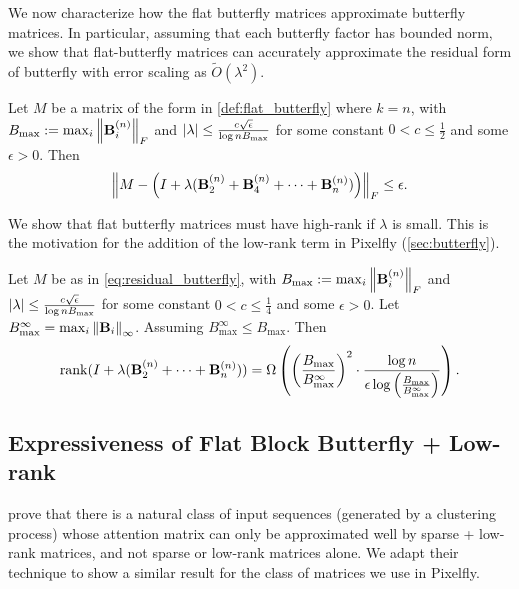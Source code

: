 We now characterize how the flat butterfly matrices approximate butterfly
matrices.
In particular, assuming that each butterfly factor has bounded norm,
we show that flat-butterfly matrices can accurately approximate the residual
form of butterfly with error scaling as $\tilde{O}(\lambda^2)$.
\begin{theorem}
  \label{thm:flat_butterfly_approx}
  Let $M$ be a matrix of the form in \cref{def:flat_butterfly} where $k = n$, with
  $B_\mathrm{max} := \max_{i} \left\|{\mathbf{B}_i^{(n)}}\right\|_F$ and
  $\left\lvert\lambda\right\rvert \leq \frac{c \sqrt{\epsilon}}{\log n B_\mathrm{max}}$ for some
  constant $0 < c \leq \frac{1}{2}$ and some $\epsilon > 0$.
  Then
  \begin{equation*}
    \left\|{M - \left( I + \lambda (\mathbf{B}_2^{(n)} + \mathbf{B}_{4}^{(n)} + \dots + \mathbf{B}_n^{(n)}) \right)}\right\|_F \leq \epsilon.
  \end{equation*}
\end{theorem}

We show that flat butterfly matrices must have high-rank if $\lambda$ is small.
This is the motivation for the addition of the low-rank term in Pixelfly (\cref{sec:butterfly}).
\begin{theorem}
  \label{thm:flat_butterfly_rank}
  Let $M$ be as in \cref{eq:residual_butterfly}, with
  $B_\mathrm{max} := \max_{i} \left\|{\mathbf{B}_i^{(n)}}\right\|_F$ and
  $\left\lvert\lambda\right\rvert \leq \frac{c \sqrt{\epsilon}}{\log n B_\mathrm{max}}$ for some
  constant $0 < c \leq \frac{1}{4}$ and some $\epsilon > 0$.
  Let $B^\infty_\mathrm{max} = \max_i \left\|{\mathbf{B}_i}\right\|_\infty$.
  Assuming $B^\infty_\mathrm{max} \leq B_\mathrm{max}$.
  Then
  \begin{equation*}
    \mathrm{rank}(I + \lambda (\mathbf{B}_2^{(n)} + \dots + \mathbf{B}_n^{(n)})) = \Omega \left( \left( \frac{B_\mathrm{max}}{B^\infty_\mathrm{max}} \right)^2 \cdot \frac{\log n}{\epsilon \log \left( \frac{B_\mathrm{max}}{B^\infty_\mathrm{max}} \right)} \right).
  \end{equation*}
\end{theorem}

\subsection{Expressiveness of Flat Block Butterfly + Low-rank}

\citet{scatterbrain} prove that there is a natural class of input sequences (generated
by a clustering process) whose attention matrix can only be approximated well by
sparse + low-rank matrices, and not sparse or low-rank matrices alone.
We adapt their technique to show a similar result for the class of matrices we
use in Pixelfly.

